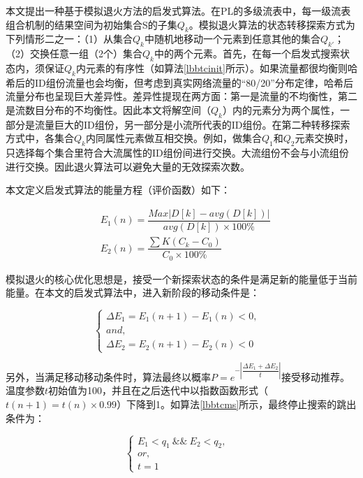 本文提出一种基于模拟退火方法的启发式算法。在PL的多级流表中，每一级流表组合机制的结果空间为初始集合S的子集$Q_k$。模拟退火算法的状态转移探索方式为下列情形二之一：（1）从集合$Q_k$中随机地移动一个元素到任意其他的集合$Q_{k'}$；（2）交换任意一组（2个）集合$Q_k$中的两个元素。首先，在每一个启发式搜索状态内，须保证$Q_k$内元素的有序性（如算法\ref{lbbtcinit}所示）。如果流量都很均衡则哈希后的ID组份流量也会均衡，但考虑到真实网络流量的“80/20”分布定律，哈希后流量分布也呈现巨大差异性。差异性提现在两方面：第一是流量的不均衡性，第二是流数目分布的不均衡性。因此本文将解空间（$Q_k$）内的元素分为两个属性，一部分是流量巨大的ID组份，另一部分是小流所代表的ID组份。在第二种转移探索方式中，各集合$Q_k$内同属性元素做互相交换。例如，做集合$Q_1$和$Q_2$元素交换时，只选择每个集合里符合大流属性的ID组份间进行交换。大流组份不会与小流组份进行交换。因此退火算法可以避免大量的无效探索次数。

本文定义启发式算法的能量方程（评价函数）如下：

%

\begin{align}\label{a4}
&E_1(n)=\dfrac{Max|D[k]-avg(D[k])|}{avg(D[k])\times 100\%}  \\
&E_2(n)=\dfrac{\sum{K}(C_k-C_0)}{C_0 \times 100\%}
\end{align}

模拟退火的核心优化思想是，接受一个新探索状态的条件是满足新的能量低于当前能量。在本文的启发式算法中，进入新阶段的移动条件是：

\begin{equation}
\left\{
\begin{array}{lr}
\Delta E_1= E_1(n+1)-E_1(n)<0, &  \\
and,& \\
\Delta E_2=E_2(n+1)-E_2(n)<0 &  
\end{array}
\right.
\end{equation}

另外，当满足移动移动条件时，算法最终以概率$P=e^{-|\dfrac{\Delta E_1 + \Delta E_2}{t} |}$接受移动推荐。温度参数$t$初始值为100，并且在之后迭代中以指数函数形式（$t(n+1)=t(n)\times 0.99$）下降到1。如算法\ref{lbbtcms}所示，最终停止搜索的跳出条件为：

\begin{equation}
\left\{
\begin{array}{lr}
E_1<q_1\  \&\& \ E_2<q_2, &  \\
or,& \\
t=1 &  
\end{array}
\right.
\end{equation}


